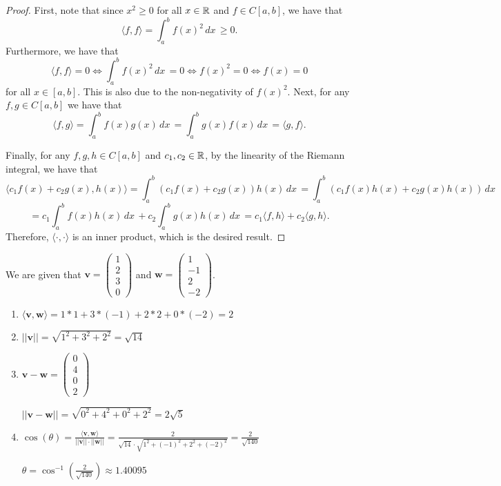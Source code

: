 \documentclass[12pt]{article}
\begin{document}
  \item
  \begin{proof}
    First, note that since $x^2\geq 0$ for all $x\in \mathbb{R}$ and $f\in C[a,b]$, we have that
    \[\langle f,f \rangle= \int_{a}^{b}f(x)^2\, dx\, \geq 0.\]
    Furthermore, we have that
    \[\langle f, f\rangle = 0 \iff \int_{a}^{b}f(x)^2\, dx\, = 0 \iff f(x)^2 = 0 \iff f(x) = 0\]
    for all $x\in [a,b]$. This is also due to the non-negativity of $f(x)^2$. Next, for any $f,g\in C[a,b]$ we have that
    \[\langle f, g \rangle = \int_{a}^{b} f(x)g(x)\, dx\, = \int_{a}^{b} g(x)f(x)\, dx\, = \langle g, f \rangle.\]

    \noindent Finally, for any $f,g,h \in C[a,b]$ and $c_{1},c_{2}\in \mathbb{R}$, by the linearity of the Riemann integral, we have that
    \[\langle c_{1}f(x)+c_{2}g(x), h(x)\rangle = \int_{a}^{b} (c_{1}f(x)+c_{2}g(x))h(x)\, dx\, = \int_{a}^{b} (c_{1}f(x)h(x)+c_{2}g(x)h(x))\, dx\,\] 
    \[= c_{1}\int_{a}^{b} f(x)h(x)\, dx\, +c_{2}\int_{a}^{b} g(x)h(x)\, dx\, = c_{1}\langle f,h\rangle+c_{2} \langle g , h\rangle.\]
    Therefore, $\langle \cdot, \cdot \rangle$ is an inner product, which is the desired result. 
  \end{proof}
  
  \item
  We are given that $\mathbf{v} = \begin{pmatrix}
    1\\
    2\\
    3\\
    0
  \end{pmatrix}$ and
  $\mathbf{w} = \begin{pmatrix}
    1\\
    -1\\
    2\\
    -2
  \end{pmatrix}$.
  \begin{enumerate}[leftmargin=!]
    \item $\langle \mathbf{v} , \mathbf{w} \rangle = 1 * 1 + 3 * (-1) + 2 * 2 + 0 * (-2) = 2$

    \item $||\mathbf{v}|| = \sqrt{1^{2} + 3^{2} + 2^{2}} = \sqrt{14}$

    \item $\mathbf{v} - \mathbf{w} = \begin{pmatrix}
      0 \\
      4 \\
      0 \\
      2
    \end{pmatrix}$

    $||\mathbf{v} - \mathbf{w}|| = \sqrt{0^{2} + 4^{2} + 0^{2} + 2^{2}} = 2\sqrt{5}$

    \item $\cos(\theta) = \frac{\langle \mathbf{v}, \mathbf{w} \rangle}{||\mathbf{v}||\cdot||\mathbf{w}||} = \frac{2}{\sqrt{14} \cdot \sqrt{1^{2} + (-1)^{2} + 2^{2} + (-2)^{2}}} = \frac{2}{\sqrt{140}}$ 
    
    $\theta = \cos^{-1}(\frac{2}{\sqrt{140}}) \approx 1.40095$
  \end{enumerate}
\end{document}

